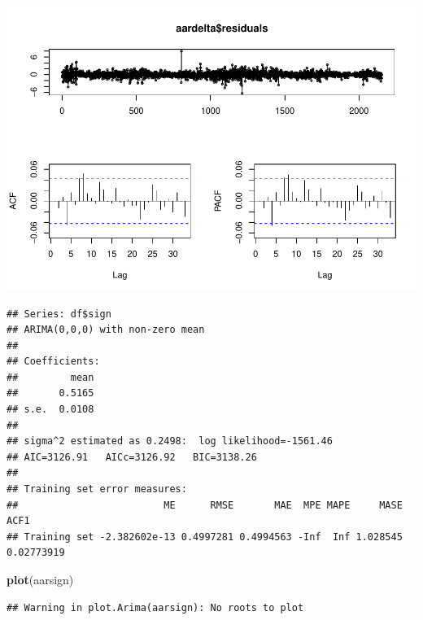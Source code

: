 \documentclass[11pt, a4paper]{report}
\newenvironment{Shaded}{\begin{snugshade}}{\end{snugshade}}
\newcommand{\DataTypeTok}[1]{\textcolor[rgb]{0.13,0.29,0.53}{#1}}
\newcommand{\DecValTok}[1]{\textcolor[rgb]{0.00,0.00,0.81}{#1}}
\newcommand{\KeywordTok}[1]{\textcolor[rgb]{0.13,0.29,0.53}{\textbf{#1}}}
\newcommand{\NormalTok}[1]{#1}
\newcommand{\OperatorTok}[1]{\textcolor[rgb]{0.81,0.36,0.00}{\textbf{#1}}}
\newcommand{\StringTok}[1]{\textcolor[rgb]{0.31,0.60,0.02}{#1}}
\theoremstyle{plain}
\theoremstyle{plain}
\theoremstyle{remark}
\begin{document}
\begin{center}\includegraphics{Econo2_P1_files/figure-latex/auto arima-8} \end{center}

\begin{Shaded}
\end{Shaded}

\begin{verbatim}
## Series: df$sign 
## ARIMA(0,0,0) with non-zero mean 
## 
## Coefficients:
##         mean
##       0.5165
## s.e.  0.0108
## 
## sigma^2 estimated as 0.2498:  log likelihood=-1561.46
## AIC=3126.91   AICc=3126.92   BIC=3138.26
## 
## Training set error measures:
##                         ME      RMSE       MAE  MPE MAPE     MASE       ACF1
## Training set -2.382602e-13 0.4997281 0.4994563 -Inf  Inf 1.028545 0.02773919
\end{verbatim}

\begin{Shaded}
\begin{Highlighting}[]
\KeywordTok{plot}\NormalTok{(aarsign)}
\end{Highlighting}
\end{Shaded}

\begin{verbatim}
## Warning in plot.Arima(aarsign): No roots to plot
\end{verbatim}
\end{document}
